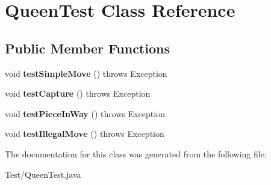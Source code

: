 \hypertarget{class_queen_test}{}\section{Queen\+Test Class Reference}
\label{class_queen_test}
\subsection*{Public Member Functions}
\begin{DoxyCompactItemize}
\item 
\hypertarget{class_queen_test_ac16af14128353207743b355fa8d809b5}{}void {\bfseries test\+Simple\+Move} ()  throws Exception \label{class_queen_test_ac16af14128353207743b355fa8d809b5}

\item 
\hypertarget{class_queen_test_a0b2e167a94a33199ce11c52f63cb56b3}{}void {\bfseries test\+Capture} ()  throws Exception \label{class_queen_test_a0b2e167a94a33199ce11c52f63cb56b3}

\item 
\hypertarget{class_queen_test_a85f9f0c32f85a555554dffd5f095fa38}{}void {\bfseries test\+Piece\+In\+Way} ()  throws Exception \label{class_queen_test_a85f9f0c32f85a555554dffd5f095fa38}

\item 
\hypertarget{class_queen_test_a10a56211d4f3fde656f9d61298060053}{}void {\bfseries test\+Illegal\+Move} ()  throws Exception \label{class_queen_test_a10a56211d4f3fde656f9d61298060053}

\end{DoxyCompactItemize}


The documentation for this class was generated from the following file\+:\begin{DoxyCompactItemize}
\item 
Test/Queen\+Test.\+java\end{DoxyCompactItemize}
